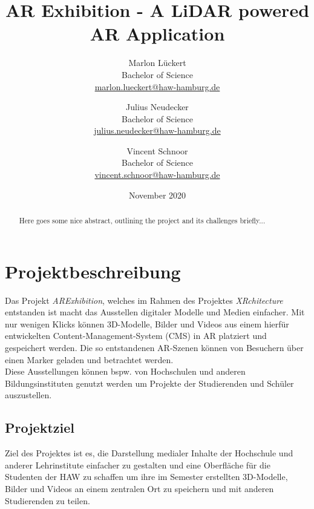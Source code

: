 \documentclass[titlepage, a4paper, 11pt]{scrartcl}
\title{AR Exhibition - A LiDAR powered AR Application}
\author{Marlon Lückert \\ Bachelor of Science \\ \href{mailto:marlon.lueckert@haw-hamburg.de}{marlon.lueckert@haw-hamburg.de} 
\and Julius Neudecker \\ Bachelor of Science \\ \href{mailto:julius.neudecker@haw-hamburg.de}{julius.neudecker@haw-hamburg.de}
\and Vincent Schnoor \\ Bachelor of Science \\ \href{mailto:vincent.schnoor@haw-hamburg.de}{vincent.schnoor@haw-hamburg.de} }
\date{November 2020}
\begin{document}
  \maketitle

  \tableofcontents

  \begin{abstract}
    Here goes some nice abstract, outlining the project and its challenges briefly...
  \end{abstract}


  \section{Projektbeschreibung}
  Das Projekt \textit{ARExhibition}, welches im Rahmen des Projektes \textit{XRchitecture} entstanden ist macht das Ausstellen digitaler Modelle und Medien einfacher. Mit nur wenigen Klicks können 3D-Modelle, Bilder und Videos aus einem hierfür entwickelten Content-Management-System (CMS) in AR platziert und gespeichert werden. Die so entstandenen AR-Szenen können von Besuchern über einen Marker geladen und betrachtet werden.\\
  Diese Ausstellungen können bspw. von Hochschulen und anderen Bildungsinstituten genutzt werden um Projekte der Studierenden und Schüler auszustellen.
  \subsection{Projektziel}
  Ziel des Projektes ist es, die Darstellung medialer Inhalte der Hochschule und anderer Lehrinstitute einfacher zu gestalten und eine Oberfläche für die Studenten der HAW zu schaffen um ihre im Semester erstellten 3D-Modelle, Bilder und Videos an einem zentralen Ort zu speichern und mit anderen Studierenden zu teilen.
\end{document}
